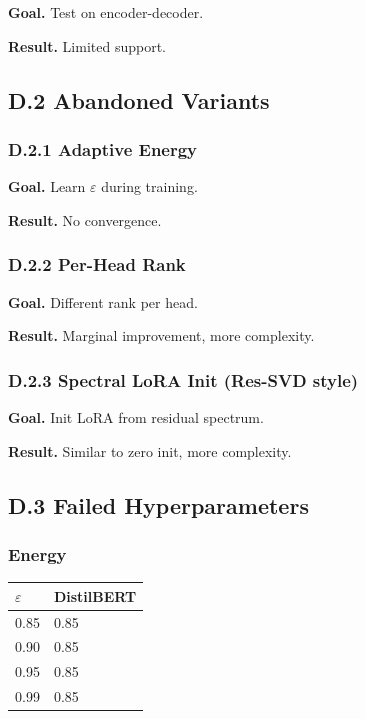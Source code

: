 \textbf{Goal.} Test on encoder-decoder.

\textbf{Result.} Limited support.

\subsection{D.2 Abandoned Variants}

\subsubsection{D.2.1 Adaptive Energy}

\textbf{Goal.} Learn $\varepsilon$ during training.

\textbf{Result.} No convergence.

\subsubsection{D.2.2 Per-Head Rank}

\textbf{Goal.} Different rank per head.

\textbf{Result.} Marginal improvement, more complexity.

\subsubsection{D.2.3 Spectral LoRA Init (Res-SVD style)}

\textbf{Goal.} Init LoRA from residual spectrum.

\textbf{Result.} Similar to zero init, more complexity.

\subsection{D.3 Failed Hyperparameters}

\subsubsection{Energy}

\begin{table}[H]
\centering
\small
\begin{tabular}{ll}
\toprule
\textbf{$\varepsilon$} & \textbf{DistilBERT} \\
\midrule
0.85 & 0.85 \\
0.90 & 0.85 \\
0.95 & 0.85 \\
0.99 & 0.85 \\
\bottomrule
\end{tabular}
\end{table}

